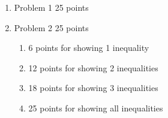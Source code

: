 \documentclass{article}
\begin{document}
\begin{enumerate}
    \begin{enumerate}
      \item Problem 1 25 points
      \item Problem 2 25 points
        \begin{enumerate}
          \item 6 points for showing 1 inequality
          \item 12 points for showing 2 inequalities
          \item 18 points for showing 3 inequalities
          \item 25 points for showing all inequalities
        \end{enumerate}
    \end{enumerate}
\end{enumerate}
\end{document}
